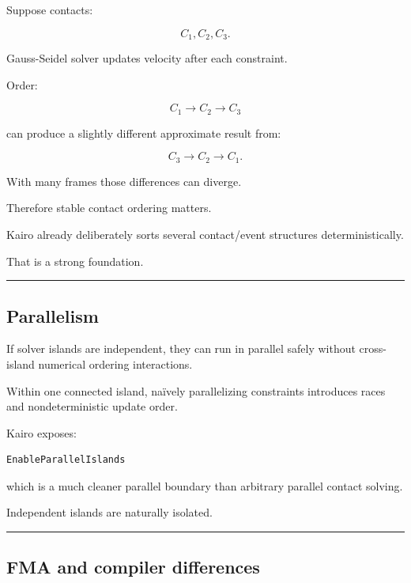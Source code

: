 Suppose contacts:

\[
C_1,C_2,C_3.
\]

Gauss-Seidel solver updates velocity after each constraint.

Order:

\[
C_1\rightarrow C_2\rightarrow C_3
\]

can produce a slightly different approximate result from:

\[
C_3\rightarrow C_2\rightarrow C_1.
\]

With many frames those differences can diverge.

Therefore stable contact ordering matters.

Kairo already deliberately sorts several contact/event structures deterministically.

That is a strong foundation.

\begin{center}\rule{0.5\linewidth}{0.5pt}\end{center}

\subsection{Parallelism}\label{06-engine-ii-ch039-parallelism}

\hypertarget{06-engine-ii-ch039-parallelism}{}

If solver islands are independent, they can run in parallel safely without cross-island numerical ordering interactions.

Within one connected island, naïvely parallelizing constraints introduces races and nondeterministic update order.

Kairo exposes:

\begin{verbatim}
EnableParallelIslands
\end{verbatim}

which is a much cleaner parallel boundary than arbitrary parallel contact solving.

Independent islands are naturally isolated.

\begin{center}\rule{0.5\linewidth}{0.5pt}\end{center}

\subsection{FMA and compiler differences}\label{06-engine-ii-ch039-fma-and-compiler-differences}

